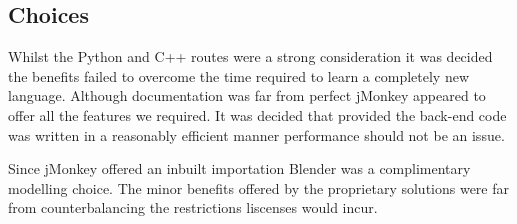 \subsection{Choices}

Whilst the Python and C++ routes were a strong consideration it was
decided the benefits failed to overcome the time required to learn
a completely new language. Although documentation was far from perfect
jMonkey appeared to offer all the features we required. It was decided
that provided the back-end code was written in a reasonably efficient
manner performance should not be an issue.

Since jMonkey offered an inbuilt importation Blender was a complimentary
modelling choice. The minor benefits offered by the proprietary solutions
were far from counterbalancing the restrictions liscenses would incur.

